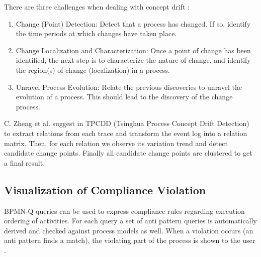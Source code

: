 \begin{multicols}{2}
There are three challenges when dealing with concept drift \cite{bose_handling_2011}:
\begin{enumerate}
    \item Change (Point) Detection: Detect that a process has changed. If so, identify the time periods at which changes have taken place.
    \item Change Localization and Characterization: Once a point of change has been identified, the next step is to characterize the nature of change, and identify the region(s) of change (localization) in a process.
    \item Unravel Process Evolution: Relate the previous discoveries to unravel the evolution of a process. This should lead to the discovery of the change process.
\end{enumerate}


C. Zheng et al. suggest in \cite{zheng_detecting_2017} TPCDD (Tsinghua Process Concept Drift Detection) to extract relations from each trace and transform the event log into a relation matrix. Then, for each relation we observe its variation trend and detect candidate change points. Finally all candidate change points are clustered to get a final result.  

\subsection{Visualization of Compliance Violation}
 BPMN-Q queries can be used to express compliance rules regarding execution ordering of activities. For each query a set of anti pattern queries is automatically derived and checked against process models as well. When a violation occurs (an anti pattern finds a match), the violating part of the process is shown to the user \cite{awad_visualization_2010}.



\end{multicols}